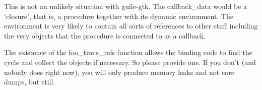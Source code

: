 \documentclass{article}
\begin{document}
This is not an unlikely situation with guile-gtk.  The callback\_data
would be a `closure', that is, a procedure together with its dynamic
environment.  The environment is very likely to contain all sorts of
references to other stuff including the very objects that the
procedure is connected to as a callback.

The existence of the foo\_trace\_refs function allows the binding code
to find the cycle and collect the objects if necessary.  So please
provide one.  If you don't (and nobody does right now), you will only
produce memory leaks and not core dumps, but still.
\end{document}
